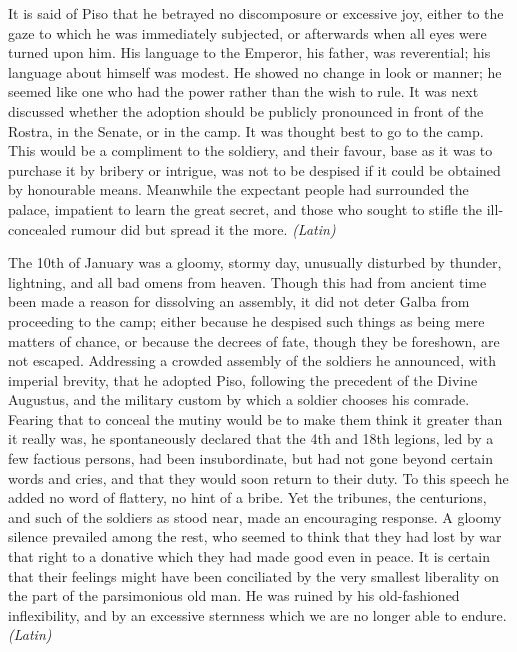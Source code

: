 It is said of Piso that he betrayed no discomposure or excessive joy, either to the gaze to which he was immediately subjected, or afterwards when all eyes were turned upon him. His language to the Emperor, his father, was reverential; his language about himself was modest. He showed no change in look or manner; he seemed like one who had the power rather than the wish to rule. It was next discussed whether the adoption should be publicly pronounced in front of the Rostra, in the Senate, or in the camp. It was thought best to go to the camp. This would be a compliment to the soldiery, and their favour, base as it was to purchase it by bribery or intrigue, was not to be despised if it could be obtained by honourable means. Meanwhile the expectant people had surrounded the palace, impatient to learn the great secret, and those who sought to stifle the ill-concealed rumour did but spread it the more. \emph{(Latin)}


The 10th of January was a gloomy, stormy day, unusually disturbed by thunder, lightning, and all bad omens from heaven. Though this had from ancient time been made a reason for dissolving an assembly, it did not deter Galba from proceeding to the camp; either because he despised such things as being mere matters of chance, or because the decrees of fate, though they be foreshown, are not escaped. Addressing a crowded assembly of the soldiers he announced, with imperial brevity, that he adopted Piso, following the precedent of the Divine Augustus, and the military custom by which a soldier chooses his comrade. Fearing that to conceal the mutiny would be to make them think it greater than it really was, he spontaneously declared that the 4th and 18th legions, led by a few factious persons, had been insubordinate, but had not gone beyond certain words and cries, and that they would soon return to their duty. To this speech he added no word of flattery, no hint of a bribe. Yet the tribunes, the centurions, and such of the soldiers as stood near, made an encouraging response. A gloomy silence prevailed among the rest, who seemed to think that they had lost by war that right to a donative which they had made good even in peace. It is certain that their feelings might have been conciliated by the very smallest liberality on the part of the parsimonious old man. He was ruined by his old-fashioned inflexibility, and by an excessive sternness which we are no longer able to endure. \emph{(Latin)}


